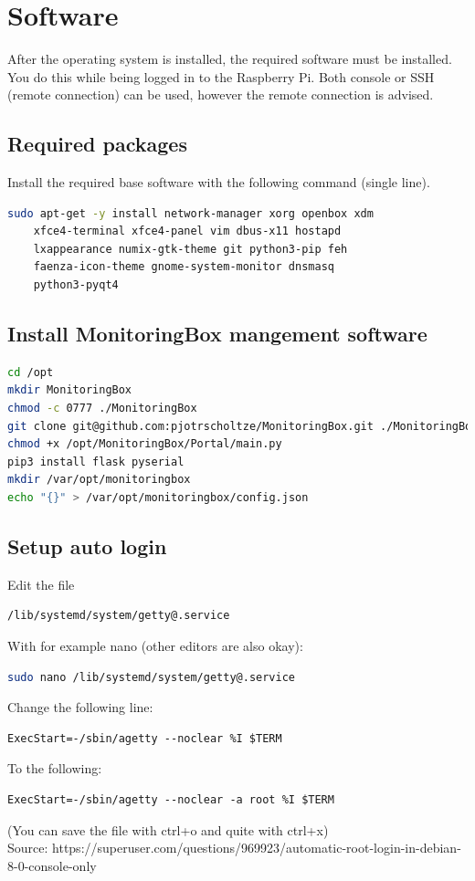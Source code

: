 \documentclass[11pt]{report}
\begin{document}
		\newpage
	\section{Software}
		After the operating system is installed, the required software must be installed. You do this while being logged in to the Raspberry Pi. Both console or SSH (remote connection) can be used, however the remote connection is advised.
		\subsection{Required packages}
			Install the required base software with the following command (single line).
			\begin{lstlisting}[language=sh]
sudo apt-get -y install network-manager xorg openbox xdm 
	xfce4-terminal xfce4-panel vim dbus-x11 hostapd
	lxappearance numix-gtk-theme git python3-pip feh
	faenza-icon-theme gnome-system-monitor dnsmasq
	python3-pyqt4
			\end{lstlisting}
		\subsection{Install MonitoringBox mangement software}
			\begin{lstlisting}[language=sh]
cd /opt
mkdir MonitoringBox
chmod -c 0777 ./MonitoringBox
git clone git@github.com:pjotrscholtze/MonitoringBox.git ./MonitoringBox
chmod +x /opt/MonitoringBox/Portal/main.py 
pip3 install flask pyserial
mkdir /var/opt/monitoringbox
echo "{}" > /var/opt/monitoringbox/config.json

			\end{lstlisting}

		\subsection{Setup auto login}
			Edit the file
			\begin{lstlisting}[language=sh]
/lib/systemd/system/getty@.service
			\end{lstlisting}
			With for example nano (other editors are also okay):
			\begin{lstlisting}[language=sh]
sudo nano /lib/systemd/system/getty@.service
			\end{lstlisting}
			Change the following line:
			\begin{lstlisting}
ExecStart=-/sbin/agetty --noclear %I $TERM
			\end{lstlisting}
			To the following:
			\begin{lstlisting}
ExecStart=-/sbin/agetty --noclear -a root %I $TERM
			\end{lstlisting}
			(You can save the file with ctrl+o and quite with ctrl+x)\\
			Source: https://superuser.com/questions/969923/automatic-root-login-in-debian-8-0-console-only
\end{document}
